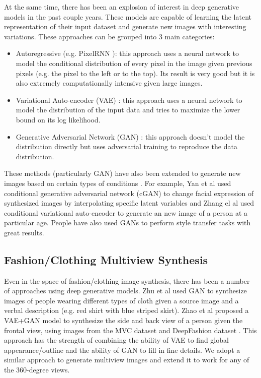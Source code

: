 \documentclass[10pt,conference]{IEEEtran}
\begin{document}
At the same time, there has been an explosion of interest in deep generative models in the past couple years. These models are capable of learning the latent representation of their input dataset and generate new images with interesting variations. These approaches can be grouped into 3 main categories:

\begin{itemize}
\item Autoregressive (e.g. PixelRNN \autocite{oord2016pixel}): this approach uses a neural network to model the conditional distribution of every pixel in the image given previous pixels (e.g. the pixel to the left or to the top). Its result is very good but it is also extremely computationally intensive given large images.

\item Variational Auto-encoder (VAE) \autocite{kingma2013auto}: this approach uses a neural network to model the distribution of the input data and tries to maximize the lower bound on its log likelihood.

\item Generative Adversarial Network (GAN) \autocite{goodfellow2014generative, radford2015unsupervised}: this approach doesn't model the distribution directly but uses adversarial training to reproduce the data distribution.

\end{itemize}

These methods (particularly GAN) have also been extended to generate new images based on certain types of conditions \autocite{mirza2014conditional}. For example, Yan et al \autocite{yan2016attribute2image} used conditional generative adversarial network (cGAN) to change facial expression of synthesized images by interpolating specific latent variables and Zhang el al \autocite{zhang2017age} used conditional variational auto-encoder to generate an new image of a person at a particular age. People have also used GANs \autocite{isola2016image, zhu2017unpaired} to perform style transfer tasks with great results.

\subsection{Fashion/Clothing Multiview Synthesis}

Even in the space of fashion/clothing image synthesis, there has been a number of approaches using deep generative models. Zhu et al \autocite{zhu2017your} used GAN to synthesize images of people wearing different types of cloth given a source image and a verbal description (e.g. red shirt with blue striped skirt). Zhao et al \autocite{zhao2017multi} proposed a VAE+GAN model to synthesize the side and back view of a person given the frontal view, using images from the MVC dataset \autocite{liu2016mvc} and DeepFashion dataset \autocite{liu2016deepfashion}. This approach has the strength of combining the ability of VAE to find global appearance/outline and the ability of GAN to fill in fine details. We adopt a similar approach to generate multiview images and extend it to work for any of the 360-degree views.
\end{document}

